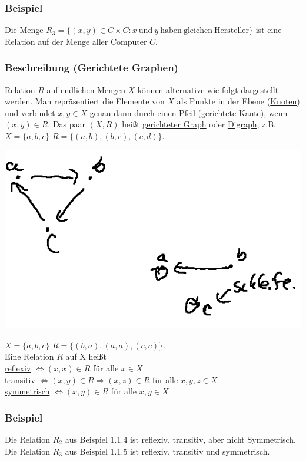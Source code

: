 \subsubsection{Beispiel}
Die Menge $R_3=\{(x,y)\in C\times C:x\ \mathrm{und\ } y \mathrm{\ haben\ gleichen\ Hersteller}\}$ ist eine Relation auf der Menge aller Computer $C$.
\subsubsection{Beschreibung (Gerichtete Graphen)}
Relation $R$ auf endlichen Mengen $X$ können alternative wie folgt dargestellt werden.  Man repr\"{a}sen\-tiert die Elemente von $X$ als Punkte in der Ebene (\underline{Knoten}) und verbindet $x,y\in X$ genau dann durch einen Pfeil (\underline{gerichtete Kante}), wenn $(x,y)\in R$.  Das paar $(X,R)$ heißt \underline{gerichteter Graph} oder \underline{Digraph}, z.B. $X=\{a,b,c\}$ $R=\{(a,b),(b,c),(c,d)\}$.\\
\begin{center}
\includegraphics[scale=0.4]{1-1-6.jpg}
\end{center}
$X=\{a,b,c\}$ $R=\{(b,a),(a,a),(c,c)\}$. \\
Eine Relation $R$ auf X heißt \\
\underline{reflexiv} $\Leftrightarrow (x,x)\in R$ für alle $x\in X$ \\
\underline{transitiv} $\Leftrightarrow (x,y)\in R \Rightarrow (x,z) \in R$ für alle $x,y,z\in X$\\
\underline{symmetrisch} $\Leftrightarrow (x,y)\in R$ für alle $x,y\in X$
\subsubsection{Beispiel}
Die Relation $R_2$ aus Beispiel 1.1.4 ist reflexiv, transitiv, aber nicht Symmetrisch.  Die Relation $R_3$ aus Beispiel 1.1.5 ist reflexiv, transitiv und symmetrisch.
